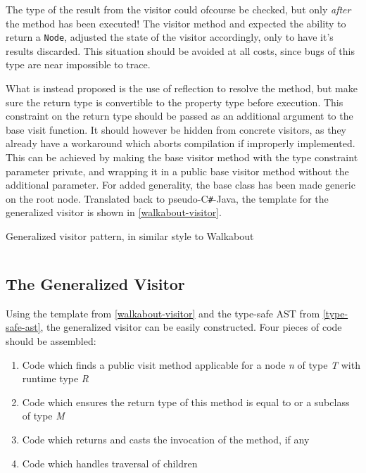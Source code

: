 \documentclass[twoside,openright]{uva-bachelor-thesis}
\newcommand{\code}[1]{\texttt{\footnotesize#1}}
\newcommand{\cs}{C\texttt{\#}\xspace}
\begin{document}
			The type of the result from the visitor could ofcourse be checked, but only \emph{after} the method has been executed! The visitor method and expected the ability to return a \code{Node}, adjusted the state of the visitor accordingly, only to have it's results discarded. This situation should be avoided at all costs, since bugs of this type are near impossible to trace.
			
			What is instead proposed is the use of reflection to resolve the method, but make sure the return type is convertible to the property type before execution. This constraint on the return type should be passed as an additional argument to the base visit function. It should however be hidden from concrete visitors, as they already have a workaround which aborts compilation if improperly implemented. This can be achieved by making the base visitor method with the type constraint parameter private, and wrapping it in a public base visitor method without the additional parameter. For added generality, the base class has been made generic on the root node. Translated back to pseudo-\cs-Java, the template for the generalized visitor is shown in \cref{walkabout-visitor}.
			
			\begin{codebox}[label=walkabout-visitor]{Generalized visitor pattern, in similar style to Walkabout}
				\inputminted[frame=leftline,linenos]{csharp}{samples/walkabout_gen.cs}
			\end{codebox}
					
		
		\subsection{The Generalized Visitor}
			Using the template from \cref{walkabout-visitor} and the type-safe AST from \cref{type-safe-ast}, the generalized visitor can be easily constructed. Four pieces of code should be assembled:
			\begin{enumerate}
				\item Code which finds a public visit method applicable for a node \emph{n} of type \emph{T} with runtime type \emph{R}
				\item Code which ensures the return type of this method is equal to or a subclass of type \emph{M}
				\item Code which returns and casts the invocation of the method, if any
				\item Code which handles traversal of children
			\end{enumerate}
			
\end{document}
